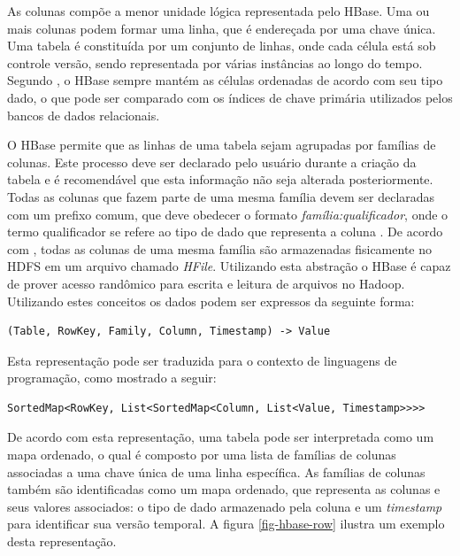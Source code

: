 As colunas compõe a menor unidade lógica representada pelo HBase. Uma ou mais colunas podem formar uma linha, que é endereçada por uma chave única. Uma tabela é constituída por um conjunto de linhas, onde cada célula está sob controle versão, sendo representada por várias instâncias ao longo do tempo. Segundo , o HBase sempre mantém as células ordenadas de acordo com seu tipo dado, o que pode ser comparado com os índices de chave primária utilizados pelos bancos de dados relacionais.

O HBase permite que as linhas de uma tabela sejam agrupadas por famílias de colunas. Este processo deve ser declarado pelo usuário durante a criação da tabela e é recomendável que esta informação não seja alterada posteriormente. Todas as colunas que fazem parte de uma mesma família devem ser declaradas com um prefixo comum, que deve obedecer o formato \textit{família:qualificador}, onde o termo qualificador se refere ao tipo de dado que representa a coluna \cite{white2012}. De acordo com , todas as colunas de uma mesma família são armazenadas fisicamente no HDFS em um arquivo chamado \textit{HFile}. Utilizando esta abstração o HBase é capaz de prover acesso randômico para escrita e leitura de arquivos no Hadoop. Utilizando estes conceitos os dados podem ser expressos da seguinte forma:

\begin{lstlisting}[style=abnt,frame=none]
(Table, RowKey, Family, Column, Timestamp) -> Value
\end{lstlisting}

Esta representação pode ser traduzida para o contexto de linguagens de programação, como mostrado a seguir:

\begin{lstlisting}[style=abnt,frame=none]
SortedMap<RowKey, List<SortedMap<Column, List<Value, Timestamp>>>>
\end{lstlisting}

De acordo com esta representação, uma tabela pode ser interpretada como um mapa ordenado, o qual é composto por uma lista de famílias de colunas associadas a uma chave única de uma linha específica. As famílias de colunas também são identificadas como um mapa ordenado, que representa as colunas e seus valores associados: o tipo de dado armazenado pela coluna e um \textit{timestamp} para identificar sua versão temporal. A figura \ref{fig-hbase-row} ilustra um exemplo desta representação. 

